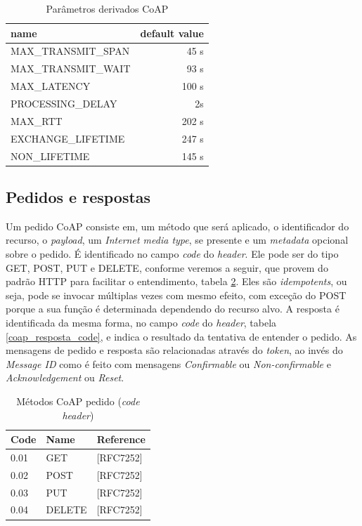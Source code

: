 \begin{table}[!htb]
	\centering
	\footnotesize\setlength{\tabcolsep}{25pt}
	\caption{Parâmetros derivados CoAP}
	\label{coap_parametro_deriv}
	\begin{tabular}{l|r}
		\hline
		name                & \multicolumn{1}{l}{default value} \\ \hline
		MAX\_TRANSMIT\_SPAN & 45 s                               \\ \hline
		MAX\_TRANSMIT\_WAIT & 93 s                               \\ \hline
		MAX\_LATENCY        & 100 s                              \\ \hline
		PROCESSING\_DELAY   & 2s                                 \\ \hline
		MAX\_RTT            & 202 s                              \\ \hline
		EXCHANGE\_LIFETIME  & 247 s                              \\ \hline
		NON\_LIFETIME       & 145 s                              \\ \hline
	\end{tabular}
\end{table}


\subsection{Pedidos e respostas}


Um pedido CoAP consiste em, um método que será aplicado, o identificador do recurso, o \textit{payload}, um \textit{Internet media type}, se presente e um \textit{metadata} opcional sobre o pedido. É identificado no campo \textit{code} do \textit{header}. Ele pode ser do tipo GET, POST, PUT e DELETE, conforme veremos a seguir, que provem do padrão HTTP para facilitar o entendimento, tabela \ref{coap_code_method}. Eles são \textit{idempotents}, ou seja, pode se invocar múltiplas vezes com mesmo efeito, com exceção do POST porque a sua função é determinada dependendo do recurso alvo.
A resposta é identificada da mesma forma, no campo \textit{code} do \textit{header}, tabela \ref{coap_resposta_code}, e indica o resultado da tentativa de entender o pedido.
As mensagens de pedido e resposta são relacionadas através do \textit{token}, ao invés do \textit{Message ID} como é feito com mensagens \textit{Confirmable} ou \textit{Non-confirmable} e \textit{Acknowledgement} ou \textit{Reset}.

\begin{table}[!htb]
	\centering
	\caption{Métodos CoAP pedido (\textit{code} \textit{header})}
	\label{coap_code_method}
	\begin{tabular}{l|l|l}
		\hline
		Code & Name    & Reference     \\ \hline
		0.01 & GET     & {[}RFC7252{]} \\ \hline
		0.02 & POST    & {[}RFC7252{]} \\ \hline
		0.03 & PUT     & {[}RFC7252{]} \\ \hline
		0.04 & DELETE  & {[}RFC7252{]} \\ \hline
	\end{tabular}
\end{table}

